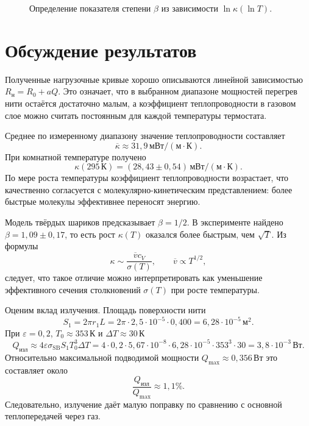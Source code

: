 \documentclass[a4paper,12pt]{article}
\begin{document}
\LogData

\begin{figure}[H]
\centering
{}
\caption{Определение показателя степени $\beta$ из зависимости $\ln\kappa(\ln T)$.}
\end{figure}

\section{Обсуждение результатов}

Полученные нагрузочные кривые хорошо описываются линейной зависимостью $R_{\text{н}}=R_0+aQ$. Это означает, что в выбранном диапазоне мощностей перегрев нити остаётся достаточно малым, а коэффициент теплопроводности в газовом слое можно считать постоянным для каждой температуры термостата.

Среднее по измеренному диапазону значение теплопроводности составляет
\[
\overline\kappa\approx 31{,}9\,\text{мВт}/(\text{м}\cdot\text{К}).
\]
При комнатной температуре получено
\[
\kappa(295\,\text{К})=(28{,}43\pm0{,}54)\,\text{мВт}/(\text{м}\cdot\text{К}).
\]
По мере роста температуры коэффициент теплопроводности возрастает, что качественно согласуется с молекулярно-кинетическим представлением: более быстрые молекулы эффективнее переносят энергию.

Модель твёрдых шариков предсказывает $\beta=1/2$. В эксперименте найдено $\beta=1{,}09\pm0{,}17$, то есть рост $\kappa(T)$ оказался более быстрым, чем $\sqrt{T}$. Из формулы
\[
\kappa\sim\frac{\overline v c_V}{\sigma(T)},
\qquad \overline v\propto T^{1/2},
\]
следует, что такое отличие можно интерпретировать как уменьшение эффективного сечения столкновений $\sigma(T)$ при росте температуры.

Оценим вклад излучения. Площадь поверхности нити
\[
S_1=2\pi r_1L=2\pi\cdot2{,}5\cdot10^{-5}\cdot0{,}400=6{,}28\cdot10^{-5}\,\text{м}^2.
\]
При $\varepsilon=0{,}2$, $T_0\approx353\,\text{К}$ и $\Delta T\approx30\,\text{К}$
\[
Q_{\text{изл}}\approx4\varepsilon\sigma_{\mathrm{SB}}S_1T_0^3\Delta T
=4\cdot0{,}2\cdot5{,}67\cdot10^{-8}\cdot6{,}28\cdot10^{-5}\cdot353^3\cdot30
=3{,}8\cdot10^{-3}\,\text{Вт}.
\]
Относительно максимальной подводимой мощности $Q_{\max}\approx0{,}356\,\text{Вт}$ это составляет около
\[
\frac{Q_{\text{изл}}}{Q_{\max}}\approx1{,}1\%.
\]
Следовательно, излучение даёт малую поправку по сравнению с основной теплопередачей через газ.
\end{document}
